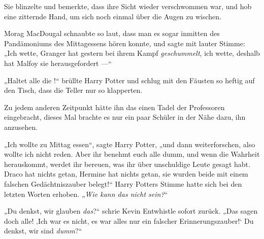 Sie blinzelte und bemerkte, dass ihre Sicht wieder verschwommen war, und hob eine zitternde Hand, um sich noch einmal über die Augen zu wischen.

Morag MacDougal schnaubte so laut, dass man es sogar inmitten des Pandämoniums des Mittagessens hören konnte, und sagte mit lauter Stimme:
„Ich wette, Granger hat gestern bei ihrem Kampf \emph{geschummelt}, ich wette, deshalb hat Malfoy sie herausgefordert —“

„Haltet alle die !“ brüllte Harry Potter und schlug mit den Fäusten so heftig auf den Tisch, dass die Teller nur so klapperten.

Zu jedem anderen Zeitpunkt hätte ihn das einen Tadel der Professoren eingebracht, dieses Mal brachte es nur ein paar Schüler in der Nähe dazu, ihn anzusehen.

„Ich wollte zu Mittag essen“, sagte Harry Potter, „und dann weiterforschen, also wollte ich nicht reden. Aber ihr benehmt euch alle dumm, und wenn die Wahrheit herauskommt, werdet ihr bereuen, was ihr über unschuldige Leute gesagt habt. Draco hat nichts getan, Hermine hat nichts getan, sie wurden beide mit einem falschen Gedächtniszauber belegt!“ Harry Potters Stimme hatte sich bei den letzten Worten erhoben.
„\emph{Wie kann das nicht  sein?}“

„Du denkst, wir glauben \emph{das}?“ schrie Kevin Entwhistle sofort zurück.
„Das sagen doch alle! ‚Ich war es nicht, es war alles nur ein falscher Erinnerungszauber!‘ Du denkst, wir sind \emph{dumm}?“

